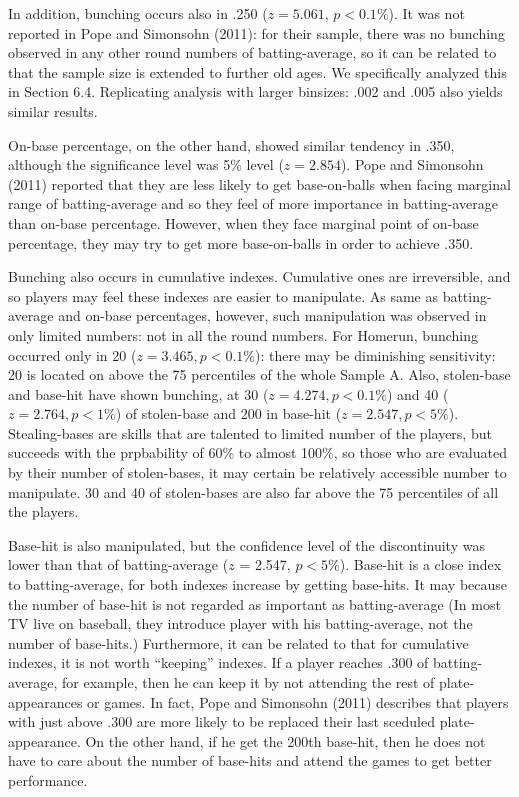 \documentclass[dvipdfmx, 12pt]{article}
\begin{document}
In addition, bunching occurs also in .250 ($z = 5.061$, $p < 0.1\%$). It was not reported in Pope and Simonsohn (2011): for their sample, there was no bunching observed in any other round numbers of batting-average, so it can be related to that the sample size is extended to further old ages. We specifically analyzed this in Section 6.4. Replicating analysis with larger binsizes: .002 and .005 also yields similar results.

On-base percentage, on the other hand, showed similar tendency in .350, although the significance level was 5\% level ($z=2.854$). Pope and Simonsohn (2011) reported that they are less likely to get base-on-balls when facing marginal range of batting-average and so they feel of more importance in batting-average than on-base percentage. However, when they face marginal point of on-base percentage, they may try to get more base-on-balls in order to achieve .350.

Bunching also occurs in cumulative indexes. Cumulative ones are irreversible, and so players may feel these indexes are easier to manipulate. As same as batting-average and on-base percentages, however, such manipulation was observed in only limited numbers: not in all the round numbers. For Homerun, bunching occurred only in 20 ($z=3.465, p < 0.1\%$): there may be diminishing sensitivity: 20 is located on above the 75 percentiles of the whole Sample A. Also, stolen-base and base-hit have shown bunching, at 30 ($z=4.274, p < 0.1\%$) and 40 ($z=2.764, p < 1\%$) of stolen-base and 200 in base-hit ($z=2.547, p < 5\%$). Stealing-bases are skills that are talented to limited number of the players, but succeeds with the prpbability of 60\% to almost 100\%, so those who are evaluated by their number of stolen-bases, it may certain be relatively accessible number to manipulate. 30 and 40 of stolen-bases are also far above the 75 percentiles of all the players.


Base-hit is also manipulated, but the confidence level of the discontinuity was lower than that of batting-average ($z$ = 2.547, $p < 5\%$). Base-hit is a close index to batting-average, for both indexes increase by getting base-hits. It may because the number of base-hit is not regarded as important as batting-average (In most TV live on baseball, they introduce player with his batting-average, not the number of base-hits.) Furthermore, it can be related to that for cumulative indexes, it is not worth ``keeping'' indexes. If a player reaches .300 of batting-average, for example, then he can keep it by not attending the rest of plate-appearances or games. In fact, Pope and Simonsohn (2011) describes that players with just above .300 are more likely to be replaced their last sceduled plate-appearance. On the other hand, if he get the 200th base-hit, then he does not have to care about the number of base-hits and attend the games to get better performance.
\end{document}

